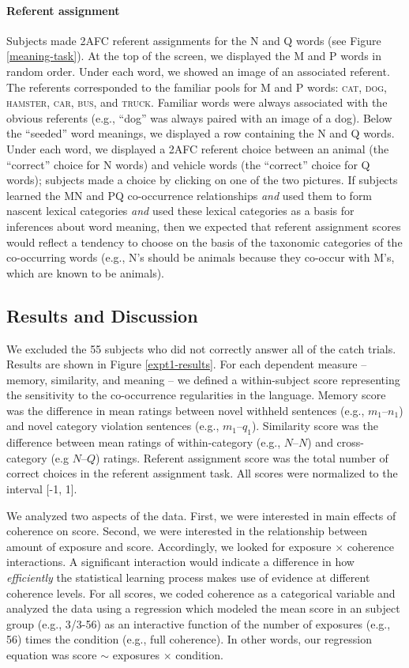 \documentclass[man,floatsintext]{apa6}
\begin{document}
\paragraph{Referent assignment}
Subjects made 2AFC referent assignments for the N and Q words (see Figure \ref{meaning-task}). At the top of the screen, we displayed the M and P words in random order. Under each word, we showed an image of an associated referent. The referents corresponded to the familiar pools for M and P words: \textsc{cat}, \textsc{dog}, \textsc{hamster}, \textsc{car}, \textsc{bus}, and \textsc{truck}. Familiar words were always associated with the obvious referents (e.g., ``dog'' was always paired with an image of a dog). Below the ``seeded'' word meanings, we displayed a row containing the N and Q words. Under each word, we displayed a 2AFC referent choice between an animal (the ``correct'' choice for N words) and vehicle words (the ``correct'' choice for Q words); subjects made a choice by clicking on one of the two pictures. If subjects learned the MN and PQ co-occurrence relationships \emph{and} used them to form nascent lexical categories \emph{and} used these lexical categories as a basis for inferences about word meaning, then we expected that referent assignment scores would reflect a tendency to choose on the basis of the taxonomic categories of the co-occurring words (e.g., N's should be animals because they co-occur with M's, which are known to be animals).

\subsection{Results and Discussion}
We excluded the 55 subjects who did not correctly answer all of the catch trials. Results are shown in Figure \ref{expt1-results}. For each dependent measure -- memory, similarity, and meaning -- we defined a within-subject score representing the sensitivity to the co-occurrence regularities in the language. Memory score was the difference in mean ratings between novel withheld sentences (e.g., $m_1$--$n_1$) and novel category violation sentences (e.g., $m_1$--$q_1$). Similarity score was the difference between mean ratings of within-category (e.g., $N$--$N$) and cross-category (e.g $N$--$Q$) ratings. Referent assignment score was the total number of correct choices in the referent assignment task. All scores were normalized to the interval [-1, 1].

We analyzed two aspects of the data. First, we were interested in main effects of coherence on score. Second, we were interested in the relationship between amount of exposure and score. Accordingly, we looked for exposure $\times$ coherence interactions. A significant interaction would indicate a difference in how \emph{efficiently} the statistical learning process makes use of evidence at different coherence levels. For all scores, we coded coherence as a categorical variable and analyzed the data using a regression which modeled the mean score in an subject group (e.g., 3/3-56) as an interactive function of the number of exposures (e.g., 56) times the condition (e.g., full coherence). In other words, our regression equation was score $\sim$ exposures $\times$ condition.
\end{document}
